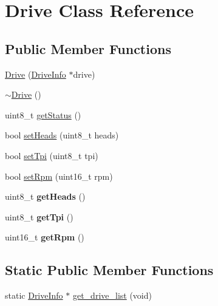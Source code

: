 \hypertarget{classDrive}{}\section{Drive Class Reference}
\label{classDrive}
\subsection*{Public Member Functions}
\begin{DoxyCompactItemize}
\item 
\hyperlink{classDrive_a4f4e8bf510bd82b4440e89426ee56122}{Drive} (\hyperlink{drive_8h_structDriveInfo}{Drive\+Info} $\ast$drive)
\item 
\hyperlink{classDrive_a9a9f96b1b0b4e841567ccf9fc2d60aaa}{$\sim$\+Drive} ()
\item 
uint8\+\_\+t \hyperlink{classDrive_a7c6f7c9049791e77d26ca6239bc7d274}{get\+Status} ()
\item 
bool \hyperlink{classDrive_a30473c2fd25a65919f11a38be6982c34}{set\+Heads} (uint8\+\_\+t heads)
\item 
bool \hyperlink{classDrive_a102cde6bc5b9af8c7a8e8461c04aa16a}{set\+Tpi} (uint8\+\_\+t tpi)
\item 
bool \hyperlink{classDrive_ac6911a7f8704518bbee6c17b2dad3609}{set\+Rpm} (uint16\+\_\+t rpm)
\item 
\hypertarget{classDrive_a1970efb5b1a6d2d5875541e8e64223a2}{}uint8\+\_\+t {\bfseries get\+Heads} ()\label{classDrive_a1970efb5b1a6d2d5875541e8e64223a2}

\item 
\hypertarget{classDrive_a4c3ab6d75e178f7fbc25dd4253c3487c}{}uint8\+\_\+t {\bfseries get\+Tpi} ()\label{classDrive_a4c3ab6d75e178f7fbc25dd4253c3487c}

\item 
\hypertarget{classDrive_a12704cf292647bdd49d937464ab9b2fd}{}uint16\+\_\+t {\bfseries get\+Rpm} ()\label{classDrive_a12704cf292647bdd49d937464ab9b2fd}

\end{DoxyCompactItemize}
\subsection*{Static Public Member Functions}
\begin{DoxyCompactItemize}
\item 
static \hyperlink{drive_8h_structDriveInfo}{Drive\+Info} $\ast$ \hyperlink{classDrive_a0f266ed4ce8f84a557be46f24c55063c}{get\+\_\+drive\+\_\+list} (void)
\end{DoxyCompactItemize}
